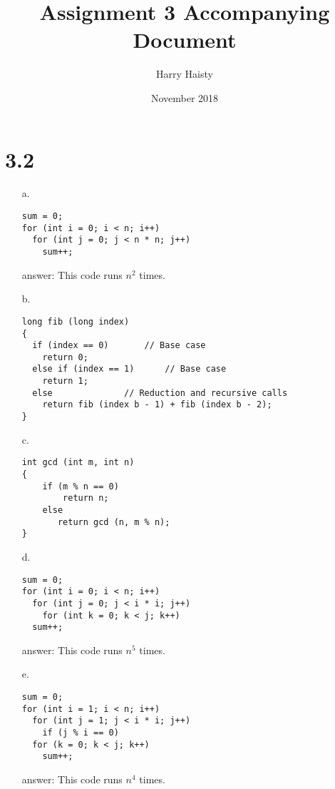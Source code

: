 \documentclass[11pt]{article}
\title{Assignment 3 Accompanying Document}
\author{Harry Haisty}
\date{November 2018}
\begin{document}
\maketitle

\section*{3.2}
\begin{enumerate}
    
    \item[a.] 
    \begin{lstlisting}
sum = 0;
for (int i = 0; i < n; i++)
  for (int j = 0; j < n * n; j++)
    sum++;
    \end{lstlisting}
    
    \item[answer:] This code runs $n^2$ times.
    
    \item[b.]
    \begin{lstlisting}
long fib (long index)
{
  if (index == 0)		// Base case
    return 0;
  else if (index == 1)		// Base case
    return 1;
  else				// Reduction and recursive calls
    return fib (index b - 1) + fib (index b - 2);
}
    \end{lstlisting}
    
    
    \item[c.]
    \begin{lstlisting}
int gcd (int m, int n)
{
    if (m % n == 0)
        return n;
    else
       return gcd (n, m % n);
}
    \end{lstlisting}
    
    
    \item[d.]
    \begin{lstlisting}
sum = 0;
for (int i = 0; i < n; i++)
  for (int j = 0; j < i * i; j++)
    for (int k = 0; k < j; k++)
  sum++;
    \end{lstlisting}
    
    \item[answer:] This code runs $n^5$ times.
    
    
    \item[e.]
    \begin{lstlisting}
sum = 0;
for (int i = 1; i < n; i++)
  for (int j = 1; j < i * i; j++)
    if (j % i == 0)
  for (k = 0; k < j; k++)
    sum++;
    \end{lstlisting}
    
    \item[answer:] This code runs $n^4$ times.
    
\end{enumerate}
\end{document}

